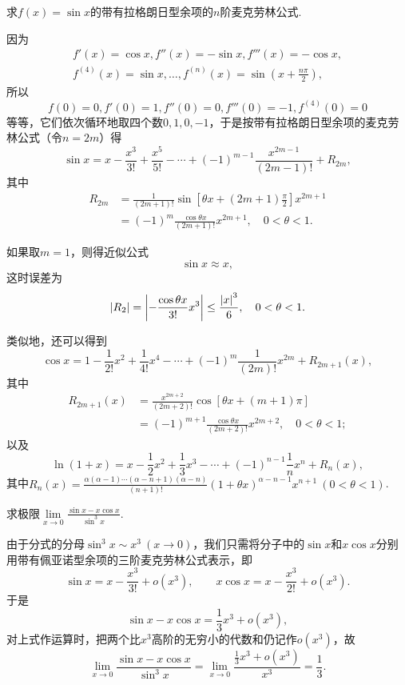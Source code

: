 \begin{example}
求\(f(x)=\sin x\)的带有拉格朗日型余项的\(n\)阶麦克劳林公式.
\begin{solution}
因为\[
\begin{split}
f'(x)=\cos x,
f''(x)=-\sin x,
f'''(x)=-\cos x, \\
f^{(4)}(x)=\sin x,
\dotsc,
f^{(n)}(x)=\sin\left(x+\frac{n\pi}{2}\right),
\end{split}
\]所以\[
f(0)=0,f'(0)=1,f''(0)=0,f'''(0)=-1,f^{(4)}(0)=0
\]等等，它们依次循环地取四个数\(0,1,0,-1\)，于是按带有拉格朗日型余项的麦克劳林公式（令\(n=2m\)）得\[
\sin x = x - \frac{x^3}{3!} + \frac{x^5}{5!} - \dotsb + (-1)^{m-1} \frac{x^{2m-1}}{(2m-1)!} + R_{2m},
\]其中\[
\begin{split}
R_{2m}
&= \frac{1}{(2m+1)!} \sin\left[\theta x + (2m+1)\frac{\pi}{2}\right] x^{2m+1} \\
&= (-1)^m \frac{\cos \theta x}{(2m+1)!} x^{2m+1},
\quad 0<\theta<1.
\end{split}
\]

如果取\(m=1\)，则得近似公式\[
\sin x \approx x,
\]这时误差为\[
\abs{R_2} = \abs{-\frac{\cos \theta x}{3!} x^3}
\leq \frac{\abs{x}^3}{6},
\quad 0<\theta<1.
\]
\end{solution}
\end{example}

类似地，还可以得到\[
\cos x
= 1 - \frac{1}{2!} x^2
	+ \frac{1}{4!} x^4 - \dotsb
	+ (-1)^m \frac{1}{(2m)!} x^{2m}
	+ R_{2m+1}(x),
\]其中\[
\begin{split}
R_{2m+1}(x)
&= \frac{x^{2m+2}}{(2m+2)!} \cos\left[\theta x + (m+1)\pi\right] \\
&= (-1)^{m+1} \frac{\cos \theta x}{(2m+2)!} x^{2m+2},
\quad 0<\theta<1;
\end{split}
\]
以及
\[
\ln (1+x) = x - \frac{1}{2} x^2 + \frac{1}{3} x^3 - \dotsb + (-1)^{n-1} \frac{1}{n} x^n + R_n(x),
\]其中\(R_n(x) = \frac{\alpha(\alpha-1)\dotsm(\alpha-n+1)(\alpha-n)}{(n+1)!} (1+\theta x)^{\alpha-n-1} x^{n+1}\ (0<\theta<1)\).

\begin{example}
求极限\(\lim\limits_{x\to0}\frac{\sin x - x \cos x}{\sin^3 x}\).
\begin{solution}
由于分式的分母\(\sin^3 x \sim x^3\ (x\to0)\)，我们只需将分子中的\(\sin x\)和\(x \cos x\)分别用带有佩亚诺型余项的三阶麦克劳林公式表示，即\[
\sin x = x - \frac{x^3}{3!} + o(x^3),
\qquad
x \cos x = x - \frac{x^3}{2!} + o(x^3).
\]于是\[
\sin x - x \cos x = \frac{1}{3} x^3 + o(x^3),
\]对上式作运算时，把两个比\(x^3\)高阶的无穷小的代数和仍记作\(o(x^3)\)，故\[
\lim\limits_{x\to0}\frac{\sin x - x \cos x}{\sin^3 x}
= \lim\limits_{x\to0}\frac{\frac{1}{3} x^3 + o(x^3)}{x^3} = \frac{1}{3}.
\]
\end{solution}
\end{example}

